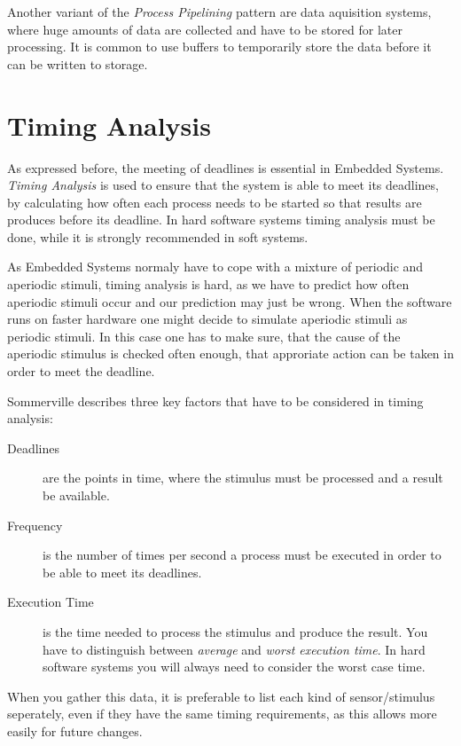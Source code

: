 \documentclass[10pt,a4paper,titlepage,draft]{article} %
\begin{document}
Another variant of the \emph{Process Pipelining} pattern are data aquisition systems, where huge amounts of data are collected and have to be stored for later processing.
It is common to use buffers to temporarily store the data before it can be written to storage.

\section{Timing Analysis}
As expressed before, the meeting of deadlines is essential in Embedded Systems.
\emph{Timing Analysis} is used to ensure that the system is able to meet its deadlines, by calculating how often each process needs to be started so that results are produces before its deadline.
In hard software systems timing analysis must be done, while it is strongly recommended in soft systems.

As Embedded Systems normaly have to cope with a mixture of periodic and aperiodic stimuli, timing analysis is hard, as we have to predict how often aperiodic stimuli occur and our prediction may just be wrong.
When the software runs on faster hardware one might decide to simulate aperiodic stimuli as periodic stimuli.
In this case one has to make sure, that the cause of the aperiodic stimulus is checked often enough, that approriate action can be taken in order to meet the deadline.

Sommerville describes three key factors that have to be considered in timing analysis:
\begin{description}
	\item[Deadlines] are the points in time, where the stimulus must be processed and a result be available.
	\item[Frequency] is the number of times per second a process must be executed in order to be able to meet its deadlines.
	\item[Execution Time] is the time needed to process the stimulus and produce the result.
	You have to distinguish between \emph{average} and \emph{worst execution time}.
	In hard software systems you will always need to consider the worst case time.
\end{description}
When you gather this data, it is preferable to list each kind of sensor/stimulus seperately, even if they have the same timing requirements, as this allows more easily for future changes.
\end{document}
